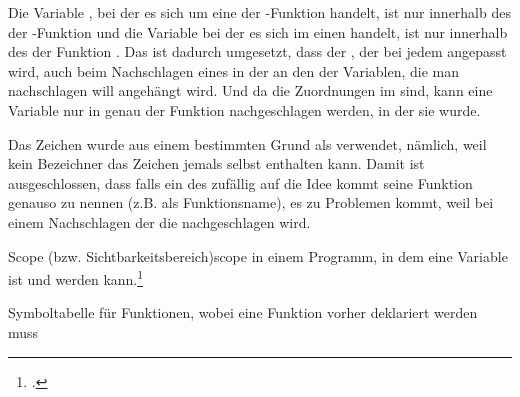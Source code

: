 Die Variable , bei der es sich um eine  der -Funktion handelt, ist nur innerhalb des  \smalltt{\{\}} der -Funktion  und die Variable  bei der es sich im einen  handelt, ist nur innerhalb des  \smalltt{\{\}} der Funktion  . Das ist dadurch umgesetzt, dass der , der bei jedem  angepasst wird, auch beim Nachschlagen eines  in der  an den  der Variablen, die man nachschlagen will angehängt wird. Und da die Zuordnungen im   sind, kann eine Variable nur in genau der Funktion nachgeschlagen werden, in der sie  wurde.

Das Zeichen  wurde aus einem bestimmten Grund als  verwendet, nämlich, weil kein Bezeichner das Zeichen  jemals selbst enthalten kann. Damit ist ausgeschlossen, dass falls ein  des  zufällig auf die Idee kommt seine Funktion genauso zu nennen (z.B.  als Funktionsname), es zu Problemen kommt, weil bei einem Nachschlagen der  die  nachgeschlagen wird.

\begin{Definition}{Scope (bzw. Sichtbarkeitsbereich)}{scope}
   in einem Programm, in dem eine Variable  ist und  werden kann.\footcite{thiemann_einfuhrung_2018}
\end{Definition}

\begin{code}
  \centering
  \caption{Symboltabelle für Funktionen, wobei eine Funktion vorher deklariert werden muss}
  \label{code:symboltabelle_für_funktionen_picoc_code_für_funktionen_wobei_eine_funktion_vorher_deklariert_werden_muss}
\end{code}

